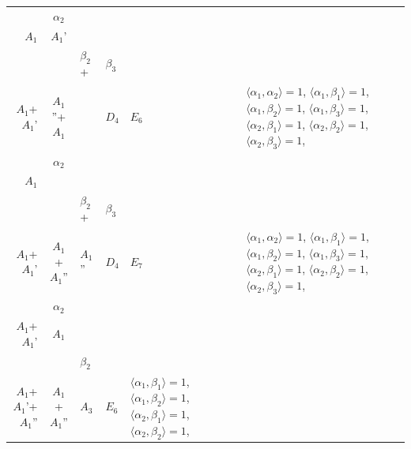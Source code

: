 \documentclass[12pt]{report}
\begin{document}
\begin{appendix}
{\begin{longtable}{rcl p{1cm}p{1cm}p{3cm} }
\\
\begin{tabular}{cc}$\alpha_1$+ & $\alpha_2$\\\tiny{ $A_1$ } & \tiny{ $A_1$' }\end{tabular} &\begin{tabular}{c} = \\~ \end{tabular} & \begin{tabular}{ccc}$\beta_1$+ & $\beta_2$+ & $\beta_3$\\\tiny{ $A_1$+$A_1$' } & \tiny{ $A_1$''+$A_1$ } & \tiny{  }\end{tabular} & $D_4$ & $E_6$ & $\langle\alpha_1, \alpha_2\rangle=1$,  $\langle\alpha_1, \beta_1\rangle=1$, $\langle\alpha_1, \beta_2\rangle=1$, $\langle\alpha_1, \beta_3\rangle=1$, $\langle\alpha_2, \beta_1\rangle=1$, $\langle\alpha_2, \beta_2\rangle=1$, $\langle\alpha_2, \beta_3\rangle=1$, 
\\
\begin{tabular}{cc}$\alpha_1$+ & $\alpha_2$\\\tiny{ $A_1$ } & \tiny{  }\end{tabular} &\begin{tabular}{c} = \\~ \end{tabular} & \begin{tabular}{ccc}$\beta_1$+ & $\beta_2$+ & $\beta_3$\\\tiny{ $A_1$+$A_1$' } & \tiny{ $A_1$+$A_1$'' } & \tiny{ $A_1$'' }\end{tabular} & $D_4$ & $E_7$ & $\langle\alpha_1, \alpha_2\rangle=1$,  $\langle\alpha_1, \beta_1\rangle=1$, $\langle\alpha_1, \beta_2\rangle=1$, $\langle\alpha_1, \beta_3\rangle=1$, $\langle\alpha_2, \beta_1\rangle=1$, $\langle\alpha_2, \beta_2\rangle=1$, $\langle\alpha_2, \beta_3\rangle=1$, 
\\
\begin{tabular}{cc}$\alpha_1$+ & $\alpha_2$\\\tiny{ $A_1$+$A_1$' } & \tiny{ $A_1$ }\end{tabular} &\begin{tabular}{c} = \\~ \end{tabular} & \begin{tabular}{cc}$\beta_1$+ & $\beta_2$\\\tiny{ $A_1$+$A_1$'+$A_1$'' } & \tiny{ $A_1$+$A_1$'' }\end{tabular} & $A_3$ & $E_6$ &  $\langle\alpha_1, \beta_1\rangle=1$, $\langle\alpha_1, \beta_2\rangle=1$, $\langle\alpha_2, \beta_1\rangle=1$, $\langle\alpha_2, \beta_2\rangle=1$, 

\end{longtable}}
\end{appendix}
\end{document}
